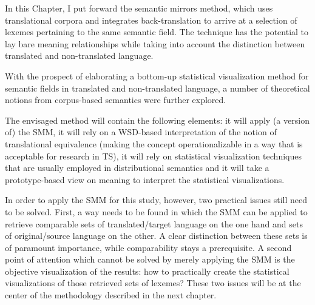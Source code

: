 In this Chapter, I put forward the semantic mirrors method, which uses translational corpora and integrates back-translation to arrive at a selection of lexemes pertaining to the same semantic field. The technique has the potential to lay bare meaning relationships while taking into account the distinction between translated and non-translated language.

With the prospect of elaborating a bottom-up statistical visualization method for semantic fields in translated and non-translated language, a number of theoretical notions from corpus-based semantics were further explored.

The envisaged method will contain the following elements: it will apply (a version of) the SMM, it will rely on a WSD-based interpretation of the notion of translational equivalence (making the concept operationalizable in a way that is acceptable for research in TS), it will rely on statistical visualization techniques that are usually employed in distributional semantics and it will take a prototype-based view on meaning to interpret the statistical visualizations.

In order to apply the SMM for this study, however, two practical issues still need to be solved. First, a way needs to be found in which the SMM can be applied to retrieve comparable sets of translated\slash target language on the one hand and sets of original\slash source language on the other. A clear distinction between these sets is of paramount importance, while comparability stays a prerequisite. A second point of attention which cannot be solved by merely applying the SMM is the objective visualization of the results: how to practically create the statistical visualizations of those retrieved sets of lexemes? These two issues will be at the center of the methodology described in the next chapter.

